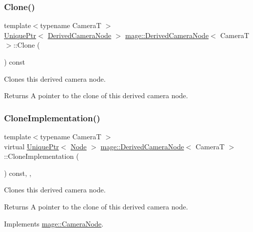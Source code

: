 \subsubsection{\texorpdfstring{Clone()}{Clone()}}
{\footnotesize\ttfamily template$<$typename CameraT $>$ \\
\hyperlink{namespacemage_a3316d7143a973e37adf1110f2e80ca31}{Unique\+Ptr}$<$ \hyperlink{classmage_1_1_derived_camera_node}{Derived\+Camera\+Node} $>$ \hyperlink{classmage_1_1_derived_camera_node}{mage\+::\+Derived\+Camera\+Node}$<$ CameraT $>$\+::Clone (\begin{DoxyParamCaption}{ }\end{DoxyParamCaption}) const}

Clones this derived camera node.

\begin{DoxyReturn}{Returns}
A pointer to the clone of this derived camera node. 
\end{DoxyReturn}
\hypertarget{classmage_1_1_derived_camera_node_aa965751029ebd6b41d3805b499a8304e}{}\label{classmage_1_1_derived_camera_node_aa965751029ebd6b41d3805b499a8304e} 
\subsubsection{\texorpdfstring{Clone\+Implementation()}{CloneImplementation()}}
{\footnotesize\ttfamily template$<$typename CameraT $>$ \\
virtual \hyperlink{namespacemage_a3316d7143a973e37adf1110f2e80ca31}{Unique\+Ptr}$<$ \hyperlink{classmage_1_1_node}{Node} $>$ \hyperlink{classmage_1_1_derived_camera_node}{mage\+::\+Derived\+Camera\+Node}$<$ CameraT $>$\+::Clone\+Implementation (\begin{DoxyParamCaption}{ }\end{DoxyParamCaption}) const\hspace{0.3cm}{\ttfamily [override]}, {\ttfamily [private]}, {\ttfamily [virtual]}}

Clones this derived camera node.

\begin{DoxyReturn}{Returns}
A pointer to the clone of this derived camera node. 
\end{DoxyReturn}


Implements \hyperlink{classmage_1_1_camera_node_a002d3a2b41cda270a26ca5d8f3a17f55}{mage\+::\+Camera\+Node}.

